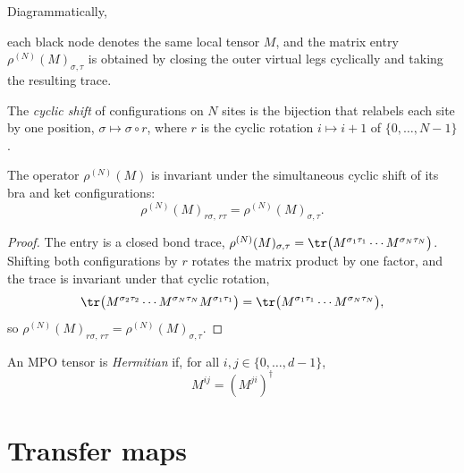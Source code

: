 Diagrammatically,
\begin{center}
\end{center}
each black node denotes the same local tensor $M$, and the matrix entry
$\rho^{(N)}(M)_{\sigma,\tau}$ is obtained by closing the outer virtual
legs cyclically and taking the resulting trace.

\begin{definition}\label{def:mpo_rotate_config}
    \leanok
    The \emph{cyclic shift} of configurations on $N$ sites is the bijection that
    relabels each site by one position, $\sigma \mapsto \sigma \circ r$, where
    $r$ is the cyclic rotation $i \mapsto i + 1$ of $\{0,\ldots,N-1\}$.
\end{definition}

\begin{theorem}
    \label{thm:mpo_translation_invariant}
    \leanok
    The operator $\rho^{(N)}(M)$ is invariant under the simultaneous cyclic shift
    of its bra and ket configurations:
    \[
        \rho^{(N)}(M)_{r\sigma,\, r\tau} = \rho^{(N)}(M)_{\sigma,\tau}.
    \]
\end{theorem}

\begin{proof}\leanok
    The entry is a closed bond trace,
    $\rho^{(N)}(M)_{\sigma,\tau}
        = \tr\bigl(M^{\sigma_1\tau_1} \cdots M^{\sigma_N\tau_N}\bigr)$.
    Shifting both configurations by $r$ rotates the matrix product by one factor,
    and the trace is invariant under that cyclic rotation,
    \[
        \tr\bigl(M^{\sigma_2\tau_2} \cdots M^{\sigma_N\tau_N} M^{\sigma_1\tau_1}\bigr)
        = \tr\bigl(M^{\sigma_1\tau_1} \cdots M^{\sigma_N\tau_N}\bigr),
    \]
    so $\rho^{(N)}(M)_{r\sigma,\,r\tau} = \rho^{(N)}(M)_{\sigma,\tau}$.
\end{proof}

\begin{definition}\label{def:mpo_hermitian}
    \leanok
    An MPO tensor is \emph{Hermitian} if, for all
    $i,j \in \{0,\ldots,d{-}1\}$,
    \[
        M^{ij} = (M^{ji})^\dagger
    \]
\end{definition}

\section{Transfer maps}

